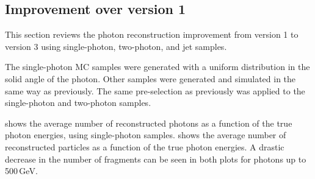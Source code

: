 \subsection{Improvement over \pandora version 1}
\label{sec:photonPerformanceCompare}

This section reviews the photon reconstruction improvement  from \pandora version 1 to version 3 using single-photon, two-photon, and jet samples.



The single-photon MC  samples were generated with a uniform distribution in the solid angle of the photon. Other samples were generated and simulated in the same way as previously. The same pre-selection as previously was applied to the  single-photon and  two-photon samples.

 shows the average number of reconstructed photons as a function of the true photon energies, using single-photon samples.  shows the average number of reconstructed particles as a function of the true photon energies. A drastic decrease in the number of fragments can be seen in both plots for photons up to 500\,GeV.

